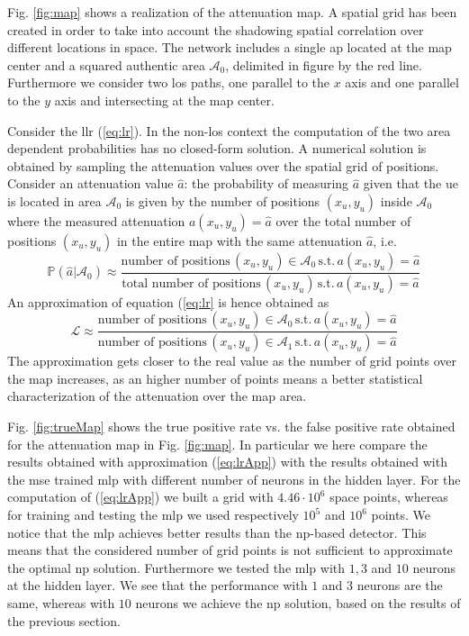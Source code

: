 \documentclass[draftcls,onecolumn,12pt]{IEEEtran}
\begin{document}
Fig. \ref{fig:map} shows a realization of the attenuation map. A spatial grid has been created in order to take into account the shadowing spatial correlation over different locations in space. The network includes a single \ac{ap} located at the map center and a squared authentic area $\mathcal{A}_0$, delimited in figure by the red line. Furthermore we consider two \ac{los} paths, one parallel to the $x$ axis and one parallel to the $y$ axis and intersecting at the map center.

Consider the \ac{llr} (\ref{eq:lr}). In the non-\ac{los} context the computation of the two area dependent probabilities has no closed-form solution. A numerical solution is obtained by sampling the attenuation values over the spatial grid of positions. Consider an attenuation value $\hat{a}$: the probability of measuring $\hat{a}$ given that the \ac{ue} is located in area $\mathcal{A}_0$ is given by the number of positions $(x_u,y_u)$ inside $\mathcal{A}_0$ where the measured attenuation $a(x_u,y_u)=\hat{a}$ over the total number of positions $(x_u,y_u)$ in the entire map with the same attenuation $\hat{a}$, i.e.
\begin{equation}
    \mathbb{P}(\hat{a}|\mathcal{A}_0) \approx \frac{\text{number of positions} \, (x_u,y_u) \in \mathcal{A}_0 \, \text{s.t.} \, a(x_u,y_u) = \hat{a}}{\text{total number of positions} \, (x_u,y_u) \, \text{s.t.} \, a(x_u,y_u) = \hat{a}}
\end{equation}
An approximation of equation (\ref{eq:lr} is hence obtained as
\begin{equation}\label{eq:lrApp}
    \mathcal{L} \approx \frac{\text{number of positions} \, (x_u,y_u) \in \mathcal{A}_0 \, \text{s.t.} \, a(x_u,y_u) = \hat{a}}{\text{number of positions} \, (x_u,y_u) \in \mathcal{A}_1 \, \text{s.t.} \, a(x_u,y_u) = \hat{a}}
\end{equation}
The approximation gets closer to the real value as the number of grid points over the map increases, as an higher number of points means a better statistical characterization of the attenuation over the map area.

Fig. \ref{fig:trueMap} shows the true positive rate vs. the false positive rate obtained for the attenuation map in Fig. \ref{fig:map}. In particular we here compare the results obtained with approximation (\ref{eq:lrApp}) with the results obtained with the \ac{mse} trained \ac{mlp} with different number of neurons in the hidden layer.
For the computation of (\ref{eq:lrApp}) we built a grid with $4.46 \cdot 10^6$ space points, whereas for training and testing the \ac{mlp} we used respectively $10^5$ and $10^6$ points. We notice that the \ac{mlp} achieves better results than the \ac{np}-based detector. This means that the considered number of grid points is not sufficient to approximate the optimal \ac{np} solution. Furthermore we tested the \ac{mlp} with $1,3$ and $10$ neurons at the hidden layer. We see that the performance with $1$ and $3$ neurons are the same, whereas with $10$ neurons we achieve the \ac{np} solution, based on the results of the previous section. 
\end{document}
